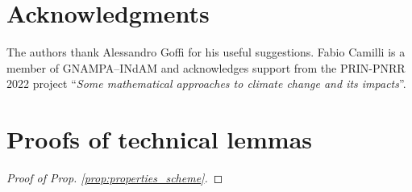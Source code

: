 \documentclass[11pt]{amsart}
\theoremstyle{remark}
\theoremstyle{definition}
\theoremstyle{Claim}
\theoremstyle{plain}
\begin{document}
\section*{Acknowledgments}
The authors thank Alessandro Goffi for his useful suggestions.
Fabio Camilli is a member of GNAMPA–INdAM and acknowledges support from the PRIN-PNRR 2022 project “\textit{Some mathematical approaches to climate change and its impacts}”.


\appendix

\section{Proofs of technical lemmas}
\begin{proof}[Proof of Prop. \ref{prop:properties_scheme}]	


\end{proof}
\end{document}
